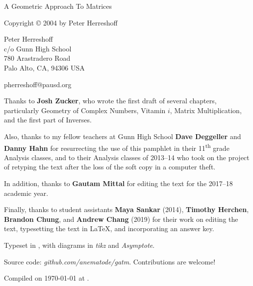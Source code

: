 \documentclass[../gatm.tex]{subfiles}
\begin{document}
\newcommand\dnew{\vspace{1cm}}

\begin{center}
	\vspace*{\fill}

	\doublespacing
	A Geometric Approach To Matrices

	Copyright \copyright{} 2004 by Peter Herreshoff  %

	\vspace{1cm}

	Peter Herreshoff\\
	c/o Gunn High School\\
	780 Arastradero Road\\
	Palo Alto, CA, 94306 USA

	\vspace{.5cm}

	pherreshoff@pausd.org

	\vspace{1cm}
\end{center}

\noindent Thanks to \textbf{Josh Zucker}, who wrote the first draft of several chapters, particularly Geometry of Complex Numbers, Vitamin $i$, Matrix Multiplication, and the first part of Inverses.

\noindent Also, thanks to my fellow teachers at Gunn High School \textbf{Dave Deggeller} and \textbf{Danny Hahn} for resurrecting the use of this pamphlet in their 11\textsuperscript{th} grade Analysis classes, and to their Analysis classes of 2013--14 who took on the project of retyping the text after the loss of the soft copy in a computer theft.

\noindent In addition, thanks to \textbf{Gautam Mittal} for editing the text for the 2017--18 academic year.

\noindent Finally, thanks to student assistants \textbf{Maya Sankar} (2014), \textbf{Timothy Herchen}, \textbf{Brandon Chung}, and \textbf{Andrew Chang} (2019) for their work on editing the text, typesetting the text in \LaTeX{}, and incorporating an answer key.

\vspace{0.5cm}

\noindent Typeset in \LaTeXe, with diagrams in \textit{tikz} and \textit{Asymptote}.

\noindent Source code: \textit{github.com/anematode/gatm}. Contributions are welcome!

\noindent Compiled on {\ddmmyyyydate\today} at \currenttime.

\vspace*{\fill}
\end{document}
